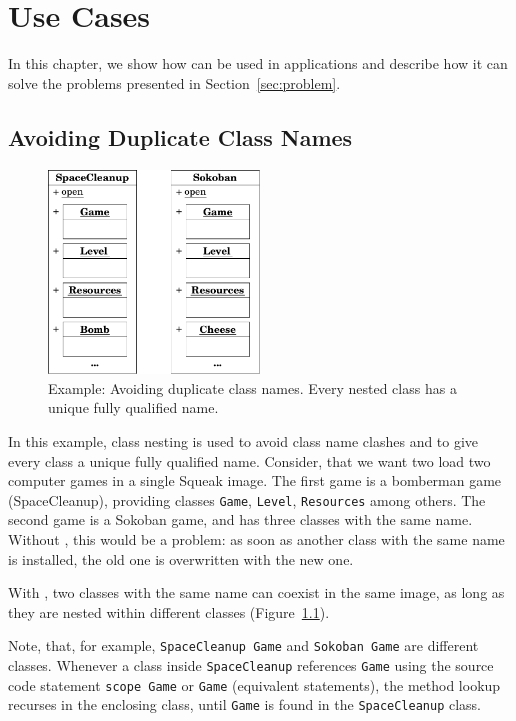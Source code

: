\chapter{Use Cases}
\label{sec:usecases}
In this chapter, we show how \msname can be used in applications and describe how it can solve the problems presented in Section~\ref{sec:problem}.

\section{Avoiding Duplicate Class Names}
\begin{figure}
	\includegraphics[width=0.5\textwidth]{usecase_class_clash.pdf}
	\centering
	\caption[Example: Avoiding duplicate class names]{Example: Avoiding duplicate class names. Every nested class has a unique fully qualified name.}
	\label{fig:use_class_clash}
\end{figure}

In this example, class nesting is used to avoid class name clashes and to give every class a unique fully qualified name. Consider, that we want two load two computer games in a single Squeak image. The first game is a bomberman game (SpaceCleanup), providing classes \texttt{Game}, \texttt{Level}, \texttt{Resources} among others. The second game is a Sokoban game, and has three classes with the same name. Without \msname, this would be a problem: as soon as another class with the same name is installed, the old one is overwritten with the new one.

With \msname, two classes with the same name can coexist in the same image, as long as they are nested within different classes (Figure~\ref{fig:use_class_clash}).

Note, that, for example, \texttt{SpaceCleanup Game} and \texttt{Sokoban Game} are different classes. Whenever a class inside \texttt{SpaceCleanup} references \texttt{Game} using the source code statement \texttt{scope Game} or \texttt{Game} (equivalent statements), the method lookup recurses in the enclosing class, until \texttt{Game} is found in the \texttt{SpaceCleanup} class.

